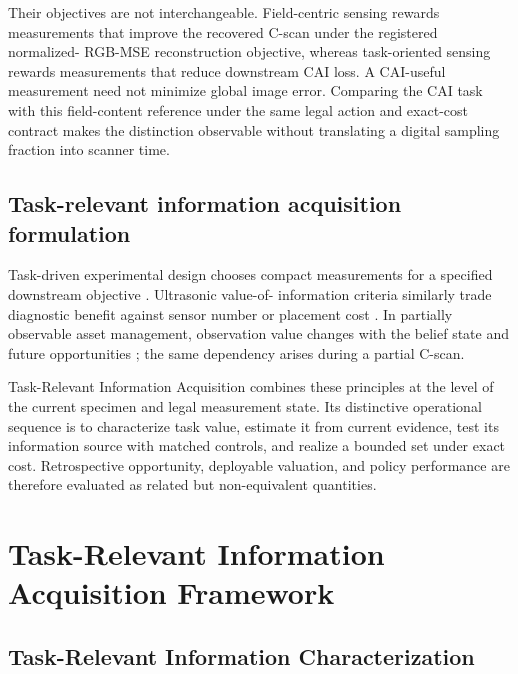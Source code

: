 \documentclass[preprint,12pt]{elsarticle}
\begin{document}
Their objectives are not interchangeable. Field-centric sensing rewards
measurements that improve the recovered C-scan under the registered normalized-
RGB-MSE reconstruction objective, whereas task-oriented sensing rewards
measurements that reduce downstream CAI loss. A CAI-useful measurement need not
minimize global image error. Comparing the CAI task with this field-content
reference under the same legal action and exact-cost contract makes the
distinction observable without translating a digital sampling fraction into
scanner time.

\subsection{Task-relevant information acquisition formulation}
\label{sec:related-task}

Task-driven experimental design chooses compact measurements for a specified
downstream objective \cite{blumberg2024experimental}. Ultrasonic value-of-
information criteria similarly trade diagnostic benefit against sensor number
or placement cost \cite{cantero2020optimal}. In partially observable asset
management, observation value changes with the belief state and future
opportunities \cite{memarzadeh2016value}; the same dependency arises during a
partial C-scan.

Task-Relevant Information Acquisition combines these principles at the level
of the current specimen and legal measurement state. Its distinctive
operational sequence is to characterize task value, estimate it from current
evidence, test its information source with matched controls, and realize a
bounded set under exact cost. Retrospective opportunity, deployable valuation,
and policy performance are therefore evaluated as related but non-equivalent
quantities.

\section{Task-Relevant Information Acquisition Framework}
\label{sec:framework}

\subsection{Task-Relevant Information Characterization}
\label{sec:framework-characterization}
\end{document}
